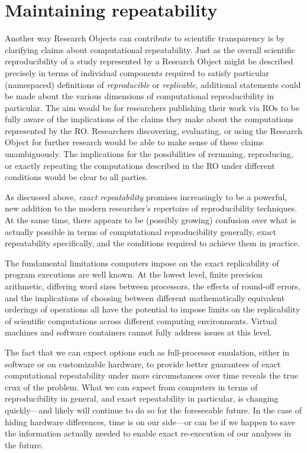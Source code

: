 \section{Maintaining repeatability}\label{sec-limitations}

Another way Research Objects can contribute to scientific transparency is by
	clarifying claims about computational repeatability.
Just as the overall scientific reproducibility of a study represented by a Research Object
	might be described precisely in terms of individual components required to 
	satisfy particular (namespaced) definitions of \emph{reproducible} or \emph{replicable},
	additional statements could be made about the various dimensions of computational
	reproducibility in particular.
The aim would be for researchers publishing their work via ROs to be fully aware
	of the implications of the claims they make about the computations represented
	by the RO.
Researchers discovering, evaluating, or using the Research Object for further research
	 would be able to make sense of these claims unambiguously.
The implications for the possibilities of rerunning, reproducing, or exactly repeating the
	computations described in the RO under different conditions would be clear
	to all parties.

As discussed above, \emph{exact repeatability} promises increasingly to be a powerful,
	new addition to the modern researcher's repertoire of reproducibility techniques.
At the same time, there appears to be (possibly growing) confusion over what is actually 
	possible in terms of computational reproducibility generally, exact repeatability 
	specifically, and the conditions required to achieve them in practice.

The fundamental limitations computers impose on the exact replicability of program executions
	are well known.
At the lowest level, finite precision arithmetic, differing word sizes between processors,
	the effects of round-off errors, and the implications of choosing between different 
	mathematically equivalent orderings of operations all have the potential to 
	impose limits on the replicability of scientific computations across different computing environments.
Virtual machines and software containers cannot fully address issues at this level.

The fact that we can expect options such as full-processor emulation, either in software or on customizable hardware, 
	to provide better guarantees of exact computational repeatability under more circumstances
	over time reveals the true crux of the problem.
What we can expect from computers in terms of reproducibility in general, and exact
	repeatability in particular, is changing quickly---and likely will continue to do so for the
	foreseeable future.
In the case of hiding hardware differences, time is on our side---or can be if we happen to save the
	information actually needed to enable exact re-execution of our analyses in the future.

